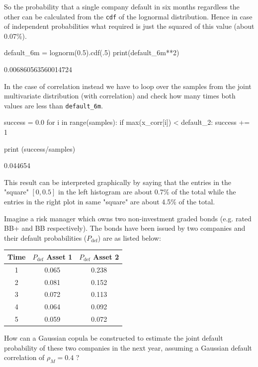 \begin{solution}
So the probability that a single company default in six months regardless the other can be calculated from the \texttt{cdf} of the lognormal distribution.
Hence in case of independent probabilities what required is just the squared of this value (about 0.07\%).

\begin{ipython}
default_6m = lognorm(0.5).cdf(.5)
print(default_6m**2)
\end{ipython}
\begin{ioutput}
0.006860563560014724
\end{ioutput}

In the case of correlation instead we have to loop over the samples from the joint multivariate distribution (with correlation) and check how many times both values are less than \texttt{default\_6m}.

\begin{ipython}
success = 0.0
for i in range(samples):
    if max(x_corr[i]) < default_2:
        success += 1

print (success/samples)
\end{ipython}
\begin{ioutput}
0.044654
\end{ioutput}

This result can be interpreted graphically by saying that the entries in the "square" $[0, 0.5]$ in the left histogram are about 0.7\% of the total while the entries in the right plot in same "square" are about 4.5\% of the total. 
\end{solution}

\begin{question}
Imagine a risk manager which owns two non-investment graded bonds (e.g. rated BB+ and BB respectively). The bonds have been issued by two companies and their default probabilities ($P_{\mathrm{def}}$) are as listed below:

\begin{table}[htbp]
\centering
\begin{tabular}{|c|c|c|}
\hline
Time & $P_{\mathrm{def}}$ Asset 1 & $P_{\mathrm{def}}$ Asset 2 \\
\hline
\hline
1 & 0.065 & 0.238 \\
2 & 0.081 & 0.152 \\
3 & 0.072 & 0.113 \\
4 & 0.064 & 0.092 \\
5 & 0.059 & 0.072 \\
\hline
\end{tabular}
\end{table}

How can a Gaussian copula be constructed to estimate the joint default probability of these two companies in the next year, assuming a Gaussian default correlation of $\rho_M = 0.4$ ?
\end{question}

